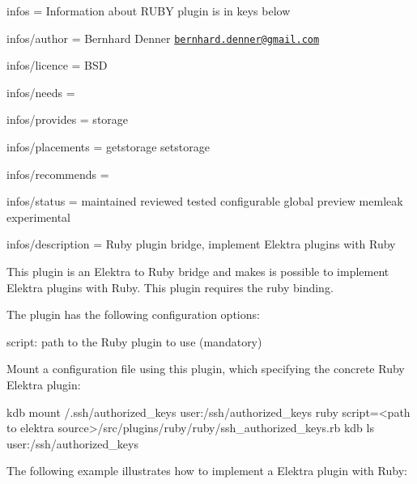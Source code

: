
\begin{DoxyItemize}
\item infos = Information about R\+U\+BY plugin is in keys below
\item infos/author = Bernhard Denner \href{mailto:bernhard.denner@gmail.com}{\tt bernhard.\+denner@gmail.\+com}
\item infos/licence = B\+SD
\item infos/needs =
\item infos/provides = storage
\item infos/placements = getstorage setstorage
\item infos/recommends =
\item infos/status = maintained reviewed tested configurable global preview memleak experimental
\item infos/description = Ruby plugin bridge, implement Elektra plugins with Ruby
\end{DoxyItemize}

This plugin is an Elektra to Ruby bridge and makes is possible to implement Elektra plugins with Ruby. This plugin requires the {\ttfamily ruby} binding.

The plugin has the following configuration options\+:


\begin{DoxyItemize}
\item {\ttfamily script}\+: path to the Ruby plugin to use (mandatory)
\end{DoxyItemize}

Mount a configuration file using this plugin, which specifying the concrete Ruby Elektra plugin\+:


\begin{DoxyCode}
kdb mount /.ssh/authorized\_keys user:/ssh/authorized\_keys ruby script=<path to elektra
source>/src/plugins/ruby/ruby/ssh\_authorized\_keys.rb
kdb ls user:/ssh/authorized\_keys
\end{DoxyCode}


The following example illustrates how to implement a Elektra plugin with Ruby\+:


